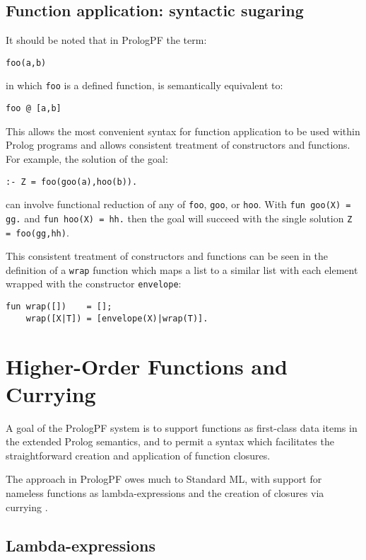\subsection{Function application: syntactic sugaring}
It should be noted that in PrologPF the term:

\texttt{foo(a,b)}

in which \texttt{foo} is a defined function, is semantically equivalent to:

\texttt{foo @ [a,b]}

This allows the most convenient syntax for function application to be used
within Prolog programs and allows consistent treatment of constructors and
functions. For example, the solution of the goal:

\texttt{:- Z = foo(goo(a),hoo(b)).}

can involve functional reduction of any of \texttt{foo}, \texttt{goo}, or
\texttt{hoo}.  With
\texttt{fun goo(X) = gg.} and \texttt{fun hoo(X) = hh.} then the goal
will succeed with the single solution \texttt{Z = foo(gg,hh)}.

This consistent treatment of constructors and functions can be seen in the
definition of a \texttt{wrap}
function which maps a list to a similar list with each element wrapped with
the constructor \texttt{envelope}:
\begin{verbatim}
fun wrap([])    = [];
    wrap([X|T]) = [envelope(X)|wrap(T)].
\end{verbatim}

\section{Higher-Order Functions and Currying} %
\label{higher-order}

A goal of the PrologPF system is to support functions as first-class data
items in the extended Prolog semantics, and to permit a syntax which 
facilitates the straightforward creation and application of function closures.

The approach in PrologPF owes much to Standard ML, with support for
nameless functions as lambda-expressions and the creation of closures
via currying \cite{Cur30, Sch24}.

\subsection{Lambda-expressions}

